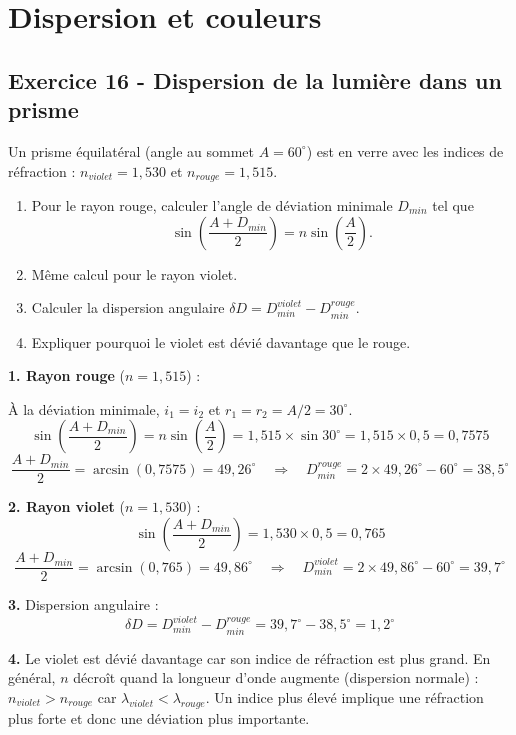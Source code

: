 \documentclass[12pt,a4paper]{article}
\begin{document}
\section{Dispersion et couleurs}

\subsection*{Exercice 16 - Dispersion de la lumière dans un prisme \niveau{\moyen}}

\begin{boiteexercice}
Un prisme équilatéral (angle au sommet $A = 60^\circ$) est en verre avec les indices de réfraction :
$n_{violet} = 1{,}530$ et $n_{rouge} = 1{,}515$.
\begin{enumerate}
  \item Pour le rayon rouge, calculer l'angle de déviation minimale $D_{min}$ tel que
  \[
  \sin\!\left(\frac{A+D_{min}}{2}\right) = n\sin\!\left(\frac{A}{2}\right).
  \]
  \item Même calcul pour le rayon violet.
  \item Calculer la dispersion angulaire $\delta D = D_{min}^{violet} - D_{min}^{rouge}$.
  \item Expliquer pourquoi le violet est dévié davantage que le rouge.
\end{enumerate}
\end{boiteexercice}

\begin{boitecorrige}
\textbf{1. Rayon rouge} ($n = 1{,}515$) :

À la déviation minimale, $i_1 = i_2$ et $r_1 = r_2 = A/2 = 30^\circ$.
\[
\sin\!\left(\frac{A+D_{min}}{2}\right) = n\sin\!\left(\frac{A}{2}\right) = 1{,}515\times\sin30^\circ = 1{,}515\times0{,}5 = 0{,}7575
\]
\[
\frac{A+D_{min}}{2} = \arcsin(0{,}7575) = 49{,}26^\circ \quad \Rightarrow \quad D_{min}^{rouge} = 2\times49{,}26^\circ - 60^\circ = 38{,}5^\circ
\]

\textbf{2. Rayon violet} ($n = 1{,}530$) :
\[
\sin\!\left(\frac{A+D_{min}}{2}\right) = 1{,}530\times0{,}5 = 0{,}765
\]
\[
\frac{A+D_{min}}{2} = \arcsin(0{,}765) = 49{,}86^\circ \quad \Rightarrow \quad D_{min}^{violet} = 2\times49{,}86^\circ - 60^\circ = 39{,}7^\circ
\]

\textbf{3.} Dispersion angulaire :
\[
\delta D = D_{min}^{violet} - D_{min}^{rouge} = 39{,}7^\circ - 38{,}5^\circ = 1{,}2^\circ
\]

\textbf{4.} Le violet est dévié davantage car son indice de réfraction est plus grand. En général, $n$ décroît quand la longueur d'onde augmente (dispersion normale) : $n_{violet} > n_{rouge}$ car $\lambda_{violet} < \lambda_{rouge}$. Un indice plus élevé implique une réfraction plus forte et donc une déviation plus importante.
\end{boitecorrige}
\end{document}
